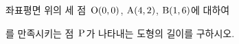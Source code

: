 좌표평면 위의 세 점~$\mathrm{O}(0{,}\mkern3mu\mathopen{}0)$, $\mathrm{A}(4{,}\mkern3mu\mathopen{}2)$, $\mathrm{B}(1{,}\mkern3mu\mathopen{}6)$에 대하여 \par\smallskip{}\par\smallskip\noindent 를 만족시키는 점~$\mathrm{P}$가 나타내는 도형의 길이를 구하시오.
